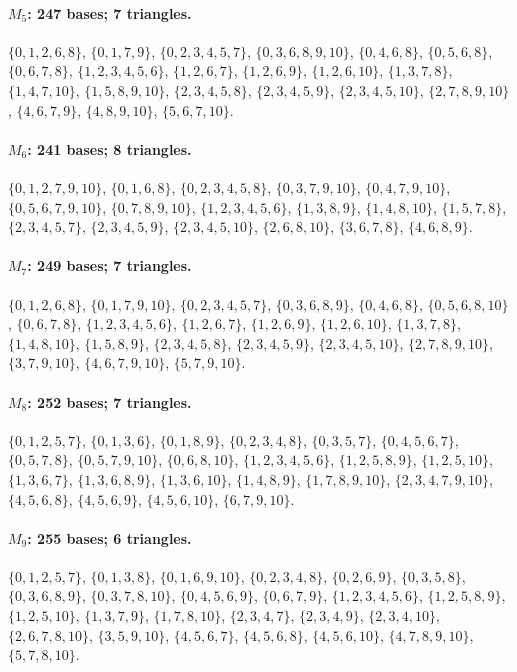 \paragraph{$M_{5}$: 247 bases; 7 triangles.}
\(\{0,1,2,6,8\}\), \(\{0,1,7,9\}\), \(\{0,2,3,4,5,7\}\), \(\{0,3,6,8,9,10\}\), \(\{0,4,6,8\}\), \(\{0,5,6,8\}\), \(\{0,6,7,8\}\), \(\{1,2,3,4,5,6\}\), \(\{1,2,6,7\}\), \(\{1,2,6,9\}\), \(\{1,2,6,10\}\), \(\{1,3,7,8\}\), \(\{1,4,7,10\}\), \(\{1,5,8,9,10\}\), \(\{2,3,4,5,8\}\), \(\{2,3,4,5,9\}\), \(\{2,3,4,5,10\}\), \(\{2,7,8,9,10\}\), \(\{4,6,7,9\}\), \(\{4,8,9,10\}\), \(\{5,6,7,10\}\).

\paragraph{$M_{6}$: 241 bases; 8 triangles.}
\(\{0,1,2,7,9,10\}\), \(\{0,1,6,8\}\), \(\{0,2,3,4,5,8\}\), \(\{0,3,7,9,10\}\), \(\{0,4,7,9,10\}\), \(\{0,5,6,7,9,10\}\), \(\{0,7,8,9,10\}\), \(\{1,2,3,4,5,6\}\), \(\{1,3,8,9\}\), \(\{1,4,8,10\}\), \(\{1,5,7,8\}\), \(\{2,3,4,5,7\}\), \(\{2,3,4,5,9\}\), \(\{2,3,4,5,10\}\), \(\{2,6,8,10\}\), \(\{3,6,7,8\}\), \(\{4,6,8,9\}\).

\paragraph{$M_{7}$: 249 bases; 7 triangles.}
\(\{0,1,2,6,8\}\), \(\{0,1,7,9,10\}\), \(\{0,2,3,4,5,7\}\), \(\{0,3,6,8,9\}\), \(\{0,4,6,8\}\), \(\{0,5,6,8,10\}\), \(\{0,6,7,8\}\), \(\{1,2,3,4,5,6\}\), \(\{1,2,6,7\}\), \(\{1,2,6,9\}\), \(\{1,2,6,10\}\), \(\{1,3,7,8\}\), \(\{1,4,8,10\}\), \(\{1,5,8,9\}\), \(\{2,3,4,5,8\}\), \(\{2,3,4,5,9\}\), \(\{2,3,4,5,10\}\), \(\{2,7,8,9,10\}\), \(\{3,7,9,10\}\), \(\{4,6,7,9,10\}\), \(\{5,7,9,10\}\).

\paragraph{$M_{8}$: 252 bases; 7 triangles.}
\(\{0,1,2,5,7\}\), \(\{0,1,3,6\}\), \(\{0,1,8,9\}\), \(\{0,2,3,4,8\}\), \(\{0,3,5,7\}\), \(\{0,4,5,6,7\}\), \(\{0,5,7,8\}\), \(\{0,5,7,9,10\}\), \(\{0,6,8,10\}\), \(\{1,2,3,4,5,6\}\), \(\{1,2,5,8,9\}\), \(\{1,2,5,10\}\), \(\{1,3,6,7\}\), \(\{1,3,6,8,9\}\), \(\{1,3,6,10\}\), \(\{1,4,8,9\}\), \(\{1,7,8,9,10\}\), \(\{2,3,4,7,9,10\}\), \(\{4,5,6,8\}\), \(\{4,5,6,9\}\), \(\{4,5,6,10\}\), \(\{6,7,9,10\}\).

\paragraph{$M_{9}$: 255 bases; 6 triangles.}
\(\{0,1,2,5,7\}\), \(\{0,1,3,8\}\), \(\{0,1,6,9,10\}\), \(\{0,2,3,4,8\}\), \(\{0,2,6,9\}\), \(\{0,3,5,8\}\), \(\{0,3,6,8,9\}\), \(\{0,3,7,8,10\}\), \(\{0,4,5,6,9\}\), \(\{0,6,7,9\}\), \(\{1,2,3,4,5,6\}\), \(\{1,2,5,8,9\}\), \(\{1,2,5,10\}\), \(\{1,3,7,9\}\), \(\{1,7,8,10\}\), \(\{2,3,4,7\}\), \(\{2,3,4,9\}\), \(\{2,3,4,10\}\), \(\{2,6,7,8,10\}\), \(\{3,5,9,10\}\), \(\{4,5,6,7\}\), \(\{4,5,6,8\}\), \(\{4,5,6,10\}\), \(\{4,7,8,9,10\}\), \(\{5,7,8,10\}\).

